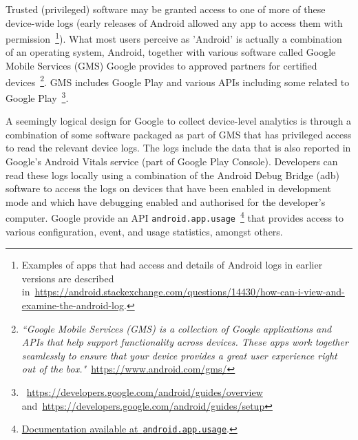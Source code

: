 Trusted (privileged) software may be granted access to one of more of these device-wide logs (early releases of Android allowed any app to access them with permission~\footnote{Examples of apps that had access and details of Android logs in earlier versions are described in~\url{https://android.stackexchange.com/questions/14430/how-can-i-view-and-examine-the-android-log}.}). What most users perceive as 'Android' is actually a combination of an operating system, Android, together with various software called Google Mobile Services (GMS) Google provides to approved partners for certified devices~\footnote{\emph{``Google Mobile Services (GMS) is a collection of Google applications and APIs that help support functionality across devices. These apps work together seamlessly to ensure that your device provides a great user experience right out of the box."}~\url{https://www.android.com/gms/}}. GMS includes Google Play and various APIs including some related to Google Play~\footnote{~\url{https://developers.google.com/android/guides/overview} and~\url{https://developers.google.com/android/guides/setup}}.

A seemingly logical design for Google to collect device-level analytics is through a combination of some software packaged as part of GMS that has privileged access to read the relevant device logs. The logs include the data that is also reported in Google's Android Vitals service (part of Google Play Console). Developers can read these logs locally using a combination of the Android Debug Bridge (adb) software to access the logs on devices that have been enabled in development mode and which have debugging enabled and authorised for the developer's computer. Google provide an API \texttt{android.app.usage}~\footnote{\href{https://developer.android.com/reference/android/app/usage/package-summary.html}{Documentation available at~\texttt{android.app.usage}}.} that provides access to various configuration, event, and usage statistics, amongst others.

